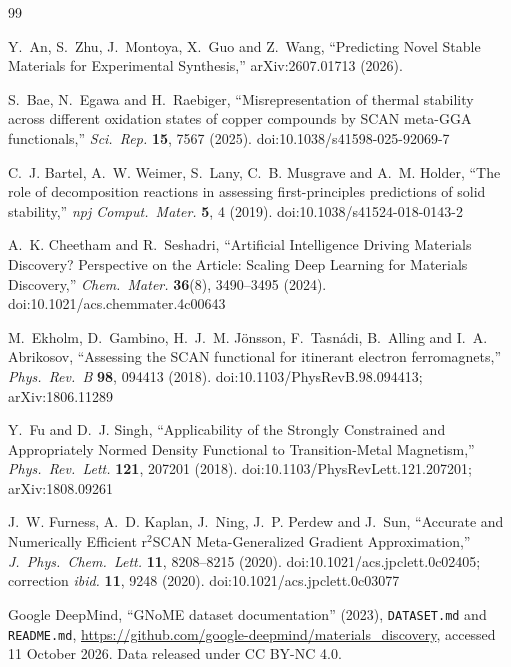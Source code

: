 \documentclass[11pt]{article}
\begin{document}
\small
\clearpage
\begin{thebibliography}{99}

 Y.~An, S.~Zhu, J.~Montoya, X.~Guo and Z.~Wang,
``Predicting Novel Stable Materials for Experimental Synthesis,'' arXiv:2607.01713 (2026).

 S.~Bae, N.~Egawa and H.~Raebiger,
``Misrepresentation of thermal stability across different oxidation states of copper
compounds by SCAN meta-GGA functionals,'' \emph{Sci.~Rep.} \textbf{15}, 7567 (2025).
doi:10.1038/s41598-025-92069-7

 C.~J. Bartel, A.~W. Weimer, S.~Lany,
C.~B. Musgrave and A.~M. Holder, ``The role of decomposition reactions in assessing
first-principles predictions of solid stability,'' \emph{npj Comput.~Mater.} \textbf{5},
4 (2019). doi:10.1038/s41524-018-0143-2

 A.~K. Cheetham and R.~Seshadri,
``Artificial Intelligence Driving Materials Discovery? Perspective on the Article: Scaling
Deep Learning for Materials Discovery,'' \emph{Chem.~Mater.} \textbf{36}(8), 3490--3495
(2024). doi:10.1021/acs.chemmater.4c00643

 M.~Ekholm, D.~Gambino, H.~J.~M. J\"onsson,
F.~Tasn\'adi, B.~Alling and I.~A. Abrikosov, ``Assessing the SCAN functional for itinerant
electron ferromagnets,'' \emph{Phys.~Rev.~B} \textbf{98}, 094413 (2018).
doi:10.1103/PhysRevB.98.094413; arXiv:1806.11289

 Y.~Fu and D.~J. Singh, ``Applicability of the
Strongly Constrained and Appropriately Normed Density Functional to Transition-Metal
Magnetism,'' \emph{Phys.~Rev.~Lett.} \textbf{121}, 207201 (2018).
doi:10.1103/PhysRevLett.121.207201; arXiv:1808.09261

 J.~W. Furness, A.~D. Kaplan, J.~Ning,
J.~P. Perdew and J.~Sun, ``Accurate and Numerically Efficient r$^2$SCAN Meta-Generalized
Gradient Approximation,'' \emph{J.~Phys.~Chem.~Lett.} \textbf{11}, 8208--8215 (2020).
doi:10.1021/acs.jpclett.0c02405; correction \emph{ibid.} \textbf{11}, 9248 (2020).
doi:10.1021/acs.jpclett.0c03077

 Google DeepMind, ``GNoME dataset
documentation'' (2023), \texttt{DATASET.md} and \texttt{README.md}, \url{https://github.com/google-deepmind/materials_discovery},
accessed 11 October 2026. Data released under CC BY-NC 4.0.


\end{thebibliography}
\end{document}
